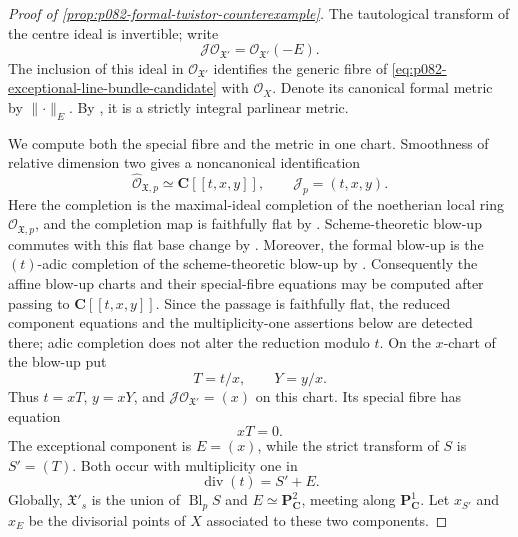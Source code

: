 \begin{proof}[Proof of
\cref{prop:p082-formal-twistor-counterexample}]
The tautological transform of the centre ideal is invertible; write
\begin{equation}\label{eq:p082-exceptional-line-bundle-candidate}
       \mathcal J\mathcal O_{\mathfrak X'}
                 =\mathcal O_{\mathfrak X'}(-E).
\end{equation}
The inclusion of this ideal in $\mathcal O_{\mathfrak X'}$ identifies the
generic fibre of \eqref{eq:p082-exceptional-line-bundle-candidate} with
$\mathcal O_X$.  Denote its canonical formal metric by
$\lVert\cdot\rVert_E$.  By
\cite[Proposition~17.7.5(b)]{CLD25}, it is a strictly integral parlinear
metric.

We compute both the special fibre and the metric in one chart.  Smoothness
of relative dimension two gives a noncanonical identification
\[
       \widehat{\mathcal O}_{\mathfrak X,p}
             \simeq \mathbf C[[t,x,y]],
       \qquad
       \mathcal J_p=(t,x,y).
\]
Here the completion is the maximal-ideal completion of the noetherian local
ring $\mathcal O_{\mathfrak X,p}$, and the completion map is faithfully
flat by \cite[Tag~00MC]{StacksProject}.  Scheme-theoretic blow-up commutes
with this flat base change by \cite[Lemma~31.33.3, Tag~01OF]{StacksProject}.
Moreover, the formal blow-up is the $(t)$-adic completion of the
scheme-theoretic blow-up by
\cite[\S8.2, Proposition~6]{Bosch14FormalRigid}.  Consequently the affine
blow-up charts and their special-fibre equations may be computed after
passing to $\mathbf C[[t,x,y]]$.  Since the passage is faithfully flat,
the reduced component equations and the multiplicity-one assertions below
are detected there; adic completion does not alter the reduction modulo
$t$.
On the $x$-chart of the blow-up put
\[
                      T=t/x,\qquad Y=y/x.
\]
Thus $t=xT$, $y=xY$, and
$\mathcal J\mathcal O_{\mathfrak X'}=(x)$ on this chart.  Its special
fibre has equation
\[
                         xT=0.
\]
The exceptional component is $E=(x)$, while the strict transform of
$S$ is $S'=(T)$.  Both occur with multiplicity one in
\begin{equation}\label{eq:p082-special-fibre-components-candidate}
                         \operatorname{div}(t)=S'+E.
\end{equation}
Globally, $\mathfrak X'_s$ is the union of
$\operatorname{Bl}_p S$ and $E\simeq\mathbf P^2_{\mathbf C}$, meeting
along $\mathbf P^1_{\mathbf C}$.  Let $x_{S'}$ and $x_E$ be the
divisorial points of $X$ associated to these two components.


\end{proof}
